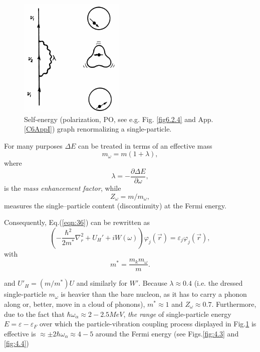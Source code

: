 \begin{figure}[h!]
\centerline {
\includegraphics*[width=5cm]{introduccion/figs/figintroD2}
}
\caption{Self-energy (polarization, PO, see e.g. Fig. \ref{fig6.2.4} and App. \ref{C6AppI}) graph renormalizing  a single-particle.}
\label{fig:4.2}
\end{figure}
For many purposes $\Delta E$ can be treated in terms of an effective mass
\begin{equation}
m_{\omega} = m(1+\lambda),
\label{eqn:38}
\end{equation}
where
\begin{equation}
\lambda= - \frac{\partial \Delta E}{\partial \omega},
\label{eqn:39}
\end{equation}
is the {\it mass enhancement factor}, while
\begin{equation}
\nonumber
Z_{\omega}=m/m_{\omega},
\end{equation}
measures the single--particle content (discontinuity) at the Fermi energy.

Consequently, Eq.(\ref{eqn:36}) can be rewritten as
\begin{equation}
\left( - \frac{\hbar^2}{2m^*} \nabla_r^2 + U_H' + i W(\omega) \right) \varphi_j(\vec{r}) = \varepsilon_j \varphi_j(\vec{r}),
\label{eqn:40a}
\end{equation}
with
\begin{equation}
m^* = \frac{m_k m_{\omega}}{m} .
\label{eqn:40b}
\end{equation}

\noindent and $U'_H = (m/m^*) U$ and similarly for $W'$. Because $\lambda \approx 0.4$ (i.e. the dressed single-particle $m_{\omega}$ is heavier than the bare nucleon, as it has to carry a phonon along or, better, move in a cloud of phonons), $m^* \approx 1$ and $Z_{\omega} \approx 0.7$. Furthermore, due to the fact that $\hbar \omega_{\alpha} \approx 2-2.5 MeV$, {\it the range} of single-particle energy $E=\varepsilon-\varepsilon_F$ over which the particle-vibration coupling process displayed in Fig.\ref{fig:4.2} is effective is $\approx \pm 2\hbar \omega_{\alpha} \approx 4-5$ around the Fermi energy (see Figs.\ref{fig:4.3} and \ref{fig:4.4})

